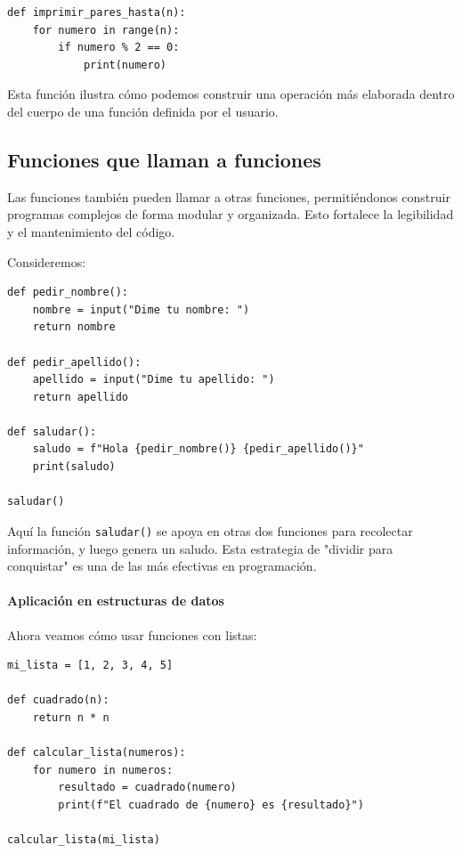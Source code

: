 \documentclass{article}
\theoremstyle{nonumberplain}
\begin{document}
\begin{verbatim}
def imprimir_pares_hasta(n):
    for numero in range(n):
        if numero % 2 == 0:
            print(numero)
\end{verbatim}

Esta función ilustra cómo podemos construir una operación más elaborada dentro del cuerpo de una función definida por el usuario.

\subsection*{Funciones que llaman a funciones}

Las funciones también pueden llamar a otras funciones, permitiéndonos construir programas complejos de forma modular y organizada. Esto fortalece la legibilidad y el mantenimiento del código.

Consideremos:

\begin{verbatim}
def pedir_nombre():
    nombre = input("Dime tu nombre: ")
    return nombre

def pedir_apellido():
    apellido = input("Dime tu apellido: ")
    return apellido

def saludar():
    saludo = f"Hola {pedir_nombre()} {pedir_apellido()}"
    print(saludo)

saludar()
\end{verbatim}

Aquí la función \texttt{saludar()} se apoya en otras dos funciones para recolectar información, y luego genera un saludo. Esta estrategia de "dividir para conquistar" es una de las más efectivas en programación.

\paragraph{Aplicación en estructuras de datos}

Ahora veamos cómo usar funciones con listas:

\begin{verbatim}
mi_lista = [1, 2, 3, 4, 5]

def cuadrado(n):
    return n * n

def calcular_lista(numeros):
    for numero in numeros:
        resultado = cuadrado(numero)
        print(f"El cuadrado de {numero} es {resultado}")

calcular_lista(mi_lista)
\end{verbatim}
\end{document}
